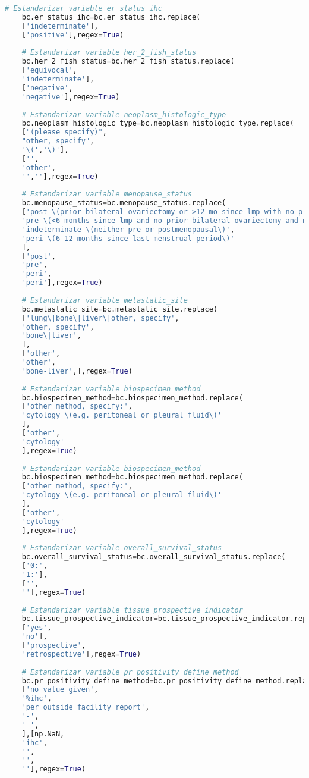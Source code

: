 \begin{lstlisting}[basicstyle=\scriptsize,language=Python, label=estandarizacion, caption=Estandarización de datos genómicos en Python.]
	# Estandarizar variable er_status_ihc
	bc.er_status_ihc=bc.er_status_ihc.replace(
	['indeterminate'],
	['positive'],regex=True)
	
	# Estandarizar variable her_2_fish_status
	bc.her_2_fish_status=bc.her_2_fish_status.replace(
	['equivocal',
	'indeterminate'],
	['negative',
	'negative'],regex=True)
	
	# Estandarizar variable neoplasm_histologic_type
	bc.neoplasm_histologic_type=bc.neoplasm_histologic_type.replace(
	["(please specify)",
	"other, specify",
	'\(','\)'],
	['',
	'other',
	'',''],regex=True)
	
	# Estandarizar variable menopause_status
	bc.menopause_status=bc.menopause_status.replace(
	['post \(prior bilateral ovariectomy or >12 mo since lmp with no prior hysterectomy\)',
	'pre \(<6 months since lmp and no prior bilateral ovariectomy and not on estrogen replacement\)',
	'indeterminate \(neither pre or postmenopausal\)',
	'peri \(6-12 months since last menstrual period\)'
	],
	['post',
	'pre',
	'peri',
	'peri'],regex=True)
	
	# Estandarizar variable metastatic_site
	bc.metastatic_site=bc.metastatic_site.replace(
	['lung\|bone\|liver\|other, specify',
	'other, specify',
	'bone\|liver',
	],
	['other',
	'other',
	'bone-liver',],regex=True)
	
	# Estandarizar variable biospecimen_method
	bc.biospecimen_method=bc.biospecimen_method.replace(
	['other method, specify:',
	'cytology \(e.g. peritoneal or pleural fluid\)'
	],
	['other',
	'cytology'
	],regex=True)
	
	# Estandarizar variable biospecimen_method
	bc.biospecimen_method=bc.biospecimen_method.replace(
	['other method, specify:',
	'cytology \(e.g. peritoneal or pleural fluid\)'
	],
	['other',
	'cytology'
	],regex=True)
	
	# Estandarizar variable overall_survival_status
	bc.overall_survival_status=bc.overall_survival_status.replace(
	['0:',
	'1:'],
	['',
	''],regex=True)
	
	# Estandarizar variable tissue_prospective_indicator
	bc.tissue_prospective_indicator=bc.tissue_prospective_indicator.replace(
	['yes',
	'no'],
	['prospective',
	'retrospective'],regex=True)
	
	# Estandarizar variable pr_positivity_define_method
	bc.pr_positivity_define_method=bc.pr_positivity_define_method.replace(
	['no value given',
	'%ihc',
	'per outside facility report',
	'-',
	' ',
	],[np.NaN,
	'ihc',
	'',
	'',
	''],regex=True)
	

\end{lstlisting}
